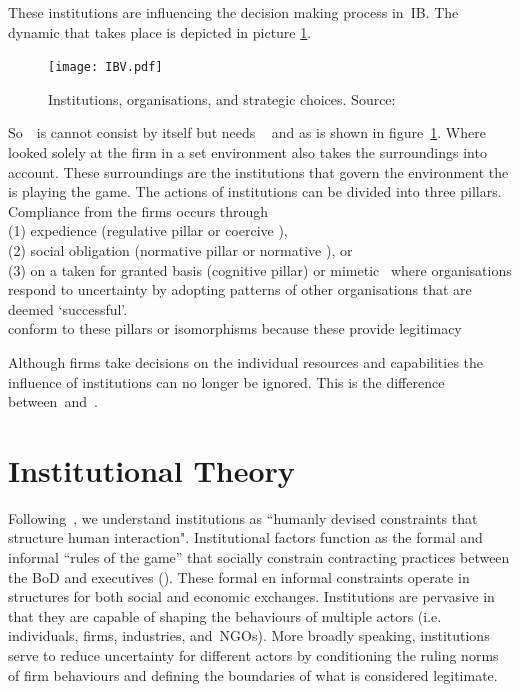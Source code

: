 These institutions are influencing the decision making process in~\gls{IB}.  The dynamic that takes place is depicted in picture \ref{fig:ibv}. 
\begin{figure}[htbp!] 
	\centering
	\texttt{[image: IBV.pdf]}
 	\caption{Institutions, organisations, and strategic choices. Source: \cite{Peng:2000}}
	\label{fig:ibv}
\end{figure}


So~\ibv~is cannot consist by itself but needs \rbv~\cite{Barney:1991} and \cite{Porter:1980} as is shown in figure~\ref{fig:ibv}. 
Where \rbv looked solely at the firm in a set environment \ibv also takes the surroundings into account. These surroundings are the institutions that govern the environment the \mne is playing the game. 
The actions of institutions can be divided into three pillars. Compliance from the firms occurs through \\(1) expedience (regulative pillar or coercive \iso),\\
 (2) social obligation (normative pillar or normative \iso), or \\
 (3) on a taken for granted basis (cognitive pillar) or mimetic \iso~where organisations respond to uncertainty by adopting patterns of other organisations that are deemed `successful'\cite{Westney:2005,Peng:2008,Kostova:1999,DiMaggio:1983,Scott:1995}.\\ 
\mne conform to these pillars or isomorphisms because these provide legitimacy~\cite{Powell:1991}

Although firms take decisions on the individual resources and capabilities \cite{Barney:1991} the influence of institutions can no longer be ignored. This is the difference between~\rbv and~\ibv. 







\section{Institutional Theory}


Following~\cite{North:1990}, we understand institutions as ``humanly devised constraints
that structure human interaction". Institutional factors function as the formal and
informal ``rules of the game'' that socially constrain contracting practices between the \gls{BoD} and 
executives (\cite{North:1990}).  
These formal en informal constraints operate in structures for both social and economic exchanges. 
Institutions are pervasive in that they are capable of shaping the behaviours of multiple actors (i.e. 
individuals, firms, industries, and~\glspl{NGO}). More broadly speaking, institutions serve to reduce 
uncertainty for different actors by conditioning the ruling norms of firm behaviours and defining the 
boundaries of what is considered legitimate.~\cite{Peng:2008}\\



